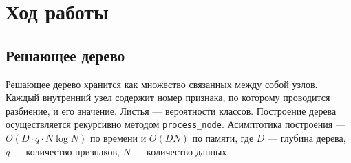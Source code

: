 \section{Ход работы}

\subsection*{Решающее дерево}

Решающее дерево хранится как множество связанных между собой узлов. Каждый внутренний узел содержит номер признака, по которому проводится разбиение, и его значение. Листья --- вероятности классов. Построение дерева осуществляется рекурсивно методом \texttt{process\_node}. Асимптотика построения --- $O(D \cdot q \cdot N\log{N})$ по времени и $O(DN)$ по памяти, где $D$ --- глубина дерева, $q$ --- количество признаков, $N$ --- количество данных.

